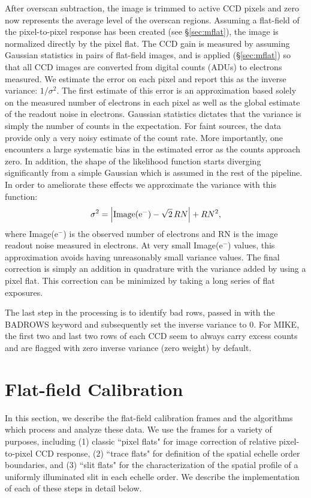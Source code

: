 \documentclass[]{emulateapj}
\begin{document}
After overscan subtraction, the image is trimmed to active CCD pixels
and zero now represents the average level of the overscan regions.  
Assuming a flat-field of the pixel-to-pixel response has been created
(see \S\ref{sec:mflat}), the image is normalized directly by the pixel flat.
The CCD gain is measured by assuming Gaussian statistics in pairs of flat-field
images, and is applied (\S\ref{sec:mflat}) 
so that all CCD images are converted from digital counts (ADUs)
to electrons measured.
We estimate the error on each pixel and report this as the inverse
variance: $1/\sigma^2$.  
The first estimate of this error is an approximation
based solely on the measured number of electrons in each pixel as well as
the global estimate of the readout noise in electrons.  Gaussian statistics
dictates that the variance is simply the number of counts in the expectation.
For faint sources, the data provide only a very
noisy estimate of the count rate. 
More importantly, one encounters a large
systematic bias in the estimated error as the counts approach zero.  
In addition, the shape of the likelihood function starts diverging 
significantly from a simple Gaussian which is assumed in the rest of 
the pipeline.  In order to ameliorate these effects we approximate the
variance with this function:
\begin{equation}
\sigma^2 = \left|{\rm Image(e^{-})} - \sqrt{2}\,RN\right| + RN^2,
\end{equation}
where Image(e$^-$) is the observed number of electrons and
RN is the image readout noise measured in electrons.
At very small Image(e$^-$) values, this approximation avoids
having unreasonably small variance values.
The final correction is simply an addition in quadrature with
the variance added by using a pixel flat.
This correction can be minimized by taking a long series of flat exposures.

The last step in the processing is to identify bad rows, passed in with 
the BADROWS keyword and subsequently set the inverse variance to 0.
For MIKE, the first two and last two rows of each CCD seem to always
carry excess counts and are flagged with zero inverse variance (zero weight)
by default.

\section{Flat-field Calibration}
\label{sec:flatfield}

In this section, we describe the flat-field calibration frames
and the algorithms which process and analyze these data.  We
use the frames for a variety of purposes, including 
(1) classic ``pixel flats" for image correction of relative 
pixel-to-pixel CCD response, 
(2) ``trace flats" for definition of the spatial echelle order boundaries, and
(3) ``slit flats" for the characterization of the spatial profile 
of a uniformly illuminated slit in each echelle order.
We describe the implementation of each of these steps in detail below.
\end{document}
